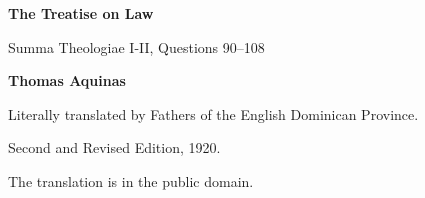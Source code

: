 \documentclass[11pt,letterpaper]{article}
\begin{document}
\color{ink}

\begin{titlepage}
\centering
\vspace*{4em}
{\LARGE\bfseries\color{heading} The Treatise on Law\par}
\vspace{1em}
{\large Summa Theologiae I-II, Questions 90--108\par}
\vspace{2em}
{\LARGE\bfseries\color{heading} Thomas Aquinas\par}
\vspace{3em}
{Literally translated by Fathers of the English Dominican Province.\par}
\vspace{0.6em}
{Second and Revised Edition, 1920.\par}
\vfill
{\small The translation is in the public domain.\par}
\vspace{2em}
\end{titlepage}

\tableofcontents


\end{document}
